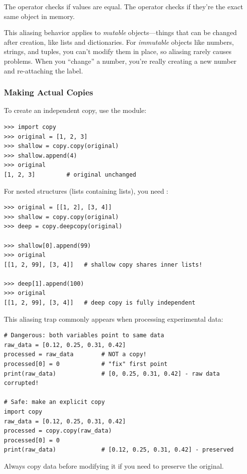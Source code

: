 The \py{==} operator checks if values are equal. The  operator checks if they're the exact same object in memory.

\begin{note}
This aliasing behavior applies to \emph{mutable} objects---things that can be changed after creation, like lists and dictionaries. For \emph{immutable} objects like numbers, strings, and tuples, you can't modify them in place, so aliasing rarely causes problems. When you ``change'' a number, you're really creating a new number and re-attaching the label.
\end{note}

\subsubsection{Making Actual Copies}

To create an independent copy, use the  module:

\begin{lstlisting}
>>> import copy
>>> original = [1, 2, 3]
>>> shallow = copy.copy(original)
>>> shallow.append(4)
>>> original
[1, 2, 3]         # original unchanged
\end{lstlisting}

For nested structures (lists containing lists), you need :

\begin{lstlisting}
>>> original = [[1, 2], [3, 4]]
>>> shallow = copy.copy(original)
>>> deep = copy.deepcopy(original)

>>> shallow[0].append(99)
>>> original
[[1, 2, 99], [3, 4]]   # shallow copy shares inner lists!

>>> deep[1].append(100)
>>> original
[[1, 2, 99], [3, 4]]   # deep copy is fully independent
\end{lstlisting}

\begin{labexample}
This aliasing trap commonly appears when processing experimental data:

\begin{lstlisting}
# Dangerous: both variables point to same data
raw_data = [0.12, 0.25, 0.31, 0.42]
processed = raw_data        # NOT a copy!
processed[0] = 0            # "fix" first point
print(raw_data)             # [0, 0.25, 0.31, 0.42] - raw data corrupted!

# Safe: make an explicit copy
import copy
raw_data = [0.12, 0.25, 0.31, 0.42]
processed = copy.copy(raw_data)
processed[0] = 0
print(raw_data)             # [0.12, 0.25, 0.31, 0.42] - preserved
\end{lstlisting}

Always copy data before modifying it if you need to preserve the original.
\end{labexample}

